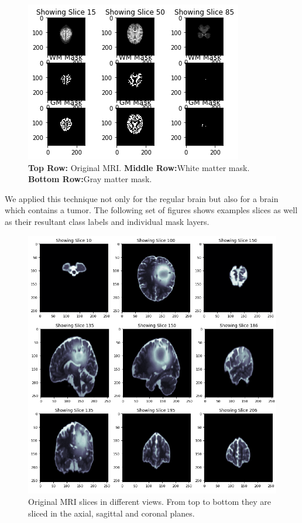 \begin{figure}[H]
  \centering
  \includegraphics[width=\linewidth]{img/resultsSegmentation.png}
  \caption{\textbf{Top Row:} Original MRI. \textbf{Middle Row:}White matter mask. \textbf{Bottom Row:}Gray matter mask.}
  \label{fig:resultsSegmentation}
\end{figure}

We applied this technique not only for the regular brain but also for a brain which contains a tumor.  The following set of figures shows examples slices as well as their resultant class labels and individual mask layers.

\begin{figure}[H]
  \centering
  \includegraphics[width=\linewidth]{img/originalMRI.png}
  \caption{Original MRI slices in different views.  From top to bottom they are sliced in the axial, sagittal and coronal planes.}
  \label{fig:originalMRI}
\end{figure}

